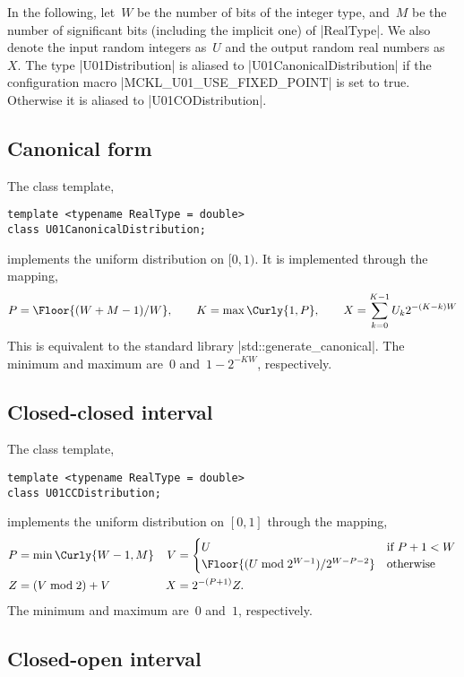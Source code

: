 In the following, let~$W$ be the number of bits of the integer type, and~$M$ be
the number of significant bits (including the implicit one) of |RealType|. We
also denote the input random integers as~$U$ and the output random real numbers
as~$X$. The type |U01Distribution| is aliased to |U01CanonicalDistribution| if
the configuration macro |MCKL_U01_USE_FIXED_POINT| is set to true. Otherwise it
is aliased to |U01CODistribution|.

\subsection{Canonical form}
\label{sub:Canonical form}

The class template,
\begin{verbatim}
template <typename RealType = double>
class U01CanonicalDistribution;
\end{verbatim}
implements the uniform distribution on $[0, 1)$. It is implemented through the
mapping,
\begin{equation*}
  P = \Floor{(W + M - 1) / W},\qquad
  K = \max\Curly{1, P},\qquad
  X = \sum_{k=0}^{K - 1} U_k 2^{-(K - k)W}
\end{equation*}
This is equivalent to the standard library |std::generate_canonical|. The
minimum and maximum are~$0$ and~$1 - 2^{-KW}$, respectively.

\subsection{Closed-closed interval}
\label{sub:Closed-closed interval}

The class template,
\begin{verbatim}
template <typename RealType = double>
class U01CCDistribution;
\end{verbatim}
implements the uniform distribution on $[0, 1]$ through the mapping,
\begin{align*}
  P &= \min\Curly{W - 1, M} &
  V &= \begin{cases}
    U &\text{if } P + 1 < W \\
    \Floor{(U \bmod 2^{W - 1}) / 2^{W - P -2}} &\text{otherwise}
  \end{cases} \\
  Z &= (V \bmod 2) + V &
  X &= 2^{-(P + 1)} Z.
\end{align*}
The minimum and maximum are~$0$ and~$1$, respectively.

\subsection{Closed-open interval}
\label{sub:Closed-open interval}


